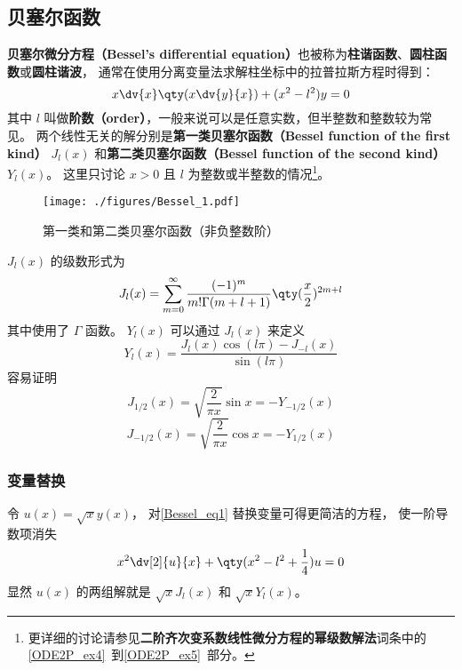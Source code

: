 

\subsection{贝塞尔函数}
\textbf{贝塞尔微分方程（Bessel's differential equation）}也被称为\textbf{柱谐函数}、\textbf{圆柱函数}或\textbf{圆柱谐波}， 通常在使用分离变量法求解柱坐标中的拉普拉斯方程时得到：
\begin{equation}\label{Bessel_eq1}
x\dv{x}\qty(x\dv{y}{x}) + (x^2 - l ^2)y = 0
\end{equation}
其中 $l$ 叫做\textbf{阶数（order）}，一般来说可以是任意实数，但半整数和整数较为常见。 两个线性无关的解分别是\textbf{第一类贝塞尔函数（Bessel function of the first kind）} $J_l(x)$ 和\textbf{第二类贝塞尔函数（Bessel function of the second kind）} $Y_l(x)$。 这里只讨论 $x > 0$ 且 $l$ 为整数或半整数的情况\footnote{更详细的讨论请参见\textbf{二阶齐次变系数线性微分方程的幂级数解法}词条中的\autoref{ODE2P_ex4}~到\autoref{ODE2P_ex5}~部分。}。

\begin{figure}[ht]
\centering
\texttt{[image: ./figures/Bessel\_1.pdf]}
\caption{第一类和第二类贝塞尔函数（非负整数阶）} \label{Bessel_fig1}
\end{figure}

$J_l(x)$ 的级数形式为
\begin{equation}\label{Bessel_eq3}
J_l(x) = \sum_{m=0}^\infty \frac{(-1)^m}{m!\Gamma(m+l+1)} \qty(\frac x2)^{2m+l}
\end{equation}
其中使用了 $\Gamma$ 函数。 $Y_l(x)$ 可以通过 $J_l(x)$ 来定义
\begin{equation}
Y_l(x) = \frac{J_l(x)\cos(l\pi) - J_{-l}(x)}{\sin(l\pi)}
\end{equation}
容易证明
\begin{equation}
J_{1/2}(x) = \sqrt{\frac{2}{\pi x}} \sin x = -Y_{-1/2}(x)
\end{equation}
\begin{equation}
J_{-1/2}(x) = \sqrt{\frac{2}{\pi x}} \cos x = -Y_{1/2}(x)
\end{equation}

\subsubsection{变量替换}
令 $u(x) = \sqrt{x} y(x)$， 对\autoref{Bessel_eq1} 替换变量可得更简洁的方程， 使一阶导数项消失
\begin{equation}
x^2\dv[2]{u}{x} + \qty(x^2 - l^2 + \frac{1}{4}) u = 0
\end{equation}
显然 $u(x)$ 的两组解就是 $\sqrt{x}J_l(x)$ 和 $\sqrt{x}Y_l(x)$。


